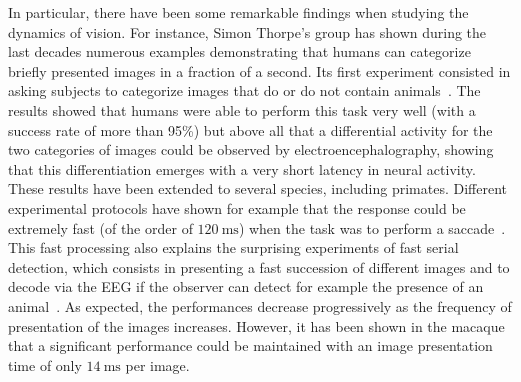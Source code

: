 \documentclass[brainsci, %
               review,submit,pdftex,moreauthors
               ]{Definitions/mdpi}
\newcommand{\ms}{\si{\milli\second}}%
\begin{document}
In particular, there have been some remarkable findings when studying the dynamics of vision. For instance, Simon Thorpe's group has shown during the last decades numerous examples demonstrating that humans can categorize briefly presented images in a fraction of a second. Its first experiment consisted in asking subjects to categorize images that do or do not contain animals~\citep{thorpe_speed_1996}. The results showed that humans were able to perform this task very well (with a success rate of more than 95\%) but above all that a differential activity for the two categories of images could be observed by electroencephalography, showing that this differentiation emerges with a very short latency in neural activity. These results have been extended to several species, including primates. Different experimental protocols have shown for example that the response could be extremely fast (of the order of $120~\ms$) when the task was to perform a saccade~\citep{kirchner_ultra-rapid_2006}. This fast processing also explains the surprising experiments of fast serial detection, which consists in presenting a fast succession of different images and to decode via the EEG if the observer can detect for example the presence of an animal~\citep{keysers_speed_2001}. As expected, the performances decrease progressively as the frequency of presentation of the images increases. However, it has been shown in the macaque that a significant performance could be maintained with an image presentation time of only $14~\ms$ per image.
\end{document}
